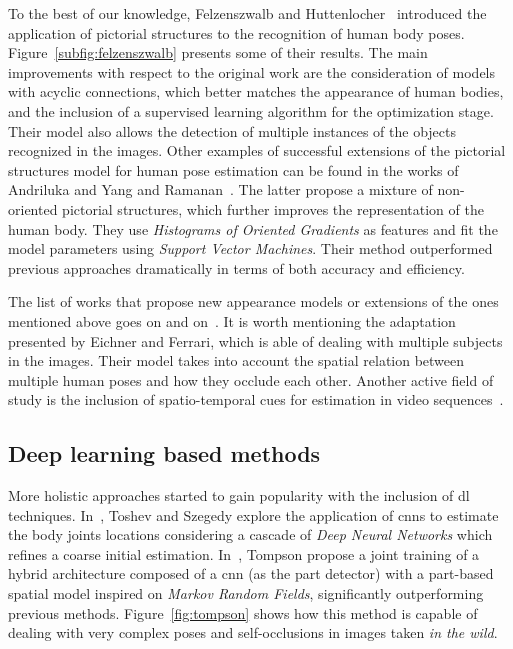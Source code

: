 To the best of our knowledge, Felzenszwalb and Huttenlocher~\cite{felzenszwalb2005pictorial} introduced the application of pictorial structures to the recognition of human body poses. Figure~\ref{subfig:felzenszwalb} presents some of their results. The main improvements with respect to the original work are the consideration of models with acyclic connections, which better matches the appearance of human bodies, and the inclusion of a supervised learning algorithm for the optimization stage. Their model also allows the detection of multiple instances of the objects recognized in the images. Other examples of successful extensions of the pictorial structures model for human pose estimation can be found in the works of Andriluka \etal\cite{Andriluka2009-on} and Yang and Ramanan~\cite{Yang2011-vn}. The latter propose a mixture of non-oriented pictorial structures, which further improves the representation of the human body. They use \emph{Histograms of Oriented Gradients} as features and fit the model parameters using \emph{Support Vector Machines}. Their method outperformed previous approaches dramatically in terms of both accuracy and efficiency.

The list of works that propose new appearance models or extensions of the ones mentioned above goes on and on~\cite{Sapp2010-dm, Pishchulin2013-zi, Kiefel2014-vm, Wang2013-wv}. It is worth mentioning the adaptation presented by Eichner and Ferrari, which is able of dealing with multiple subjects in the images. Their model takes into account the spatial relation between multiple human poses and how they occlude each other. Another active field of study is the inclusion of spatio-temporal cues for estimation in video sequences~\cite{Cherian2014-zf, Fathi2007-dc, Ferrari2008-ry, Zhang2015-js}.

\subsection{Deep learning based methods}\label{subsec:dl_2d_estimation}
More holistic approaches started to gain popularity with the inclusion of \gls{dl} techniques. In~\cite{Toshev2014-ou}, Toshev and Szegedy explore the application of \glspl{cnn} to estimate the body joints locations considering a cascade of \emph{Deep Neural Networks} which refines a coarse initial estimation. In~\cite{Tompson2014-iq}, Tompson \etal propose a joint training of a hybrid architecture composed of a \gls{cnn} (as the part detector) with a part-based spatial model inspired on \emph{Markov Random Fields}, significantly outperforming previous methods. Figure~\ref{fig:tompson} shows how this method is capable of dealing with very complex poses and self-occlusions in images taken \emph{in the wild}.

